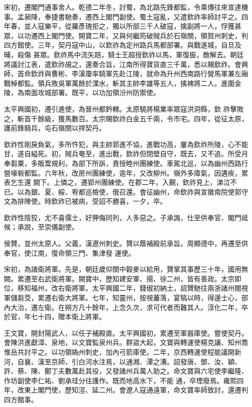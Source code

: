 \begin{pinyinscope}
 宋初，遷閣門通事舍人。乾德二年冬，討蜀，為北路先鋒都監，令乘傳往來宣達機事。孟昶降，奉捷書馳奏，遷西上閣門副使。蜀土寇亂，又遣欽祚率師討平之。四年春，並人寇樂平，從羅彥瑰拒之，獨以所部三千人破寇，擒副將一人，俘獲甚眾，以功遷西上閣門使。開寶二年，又與何繼筠破賊兵於石嶺關，領賀州刺史，判四方館使。三年，契丹寇中山，以欽祚為定州路兵馬都部署。與戰遂城，自旦及晡，殺傷
 甚眾。欽祚馬中流矢踣，騎士王超授欽祚以馬，軍復振，敵解去。朝廷將議討江表，遣欽祚覘之，還奏合旨，江南所得寶貨直三千萬，悉以賜欽祚。會興師，首命欽祚與曹彬、李漢瓊率騎軍先赴江陵，就命為升州西南路行營馬軍兼左廂戰棹都監。領兵敗吳軍萬餘於溧水，斬其主帥李雄等五人，擒裨將二人。進圍金陵，為南面攻城部署。既平，以功加領汾州防禦使。



 太平興國初，遷引進使，為晉州都鈐轄。太原驍將楊業率眾寇洪洞縣，欽
 祚擊敗之，斬首千餘級，獲馬數百。太宗賜欽祚白金五千兩，令市宅。四年，從征太原，護前鋒騎兵，屯石嶺關以捍契丹。



 欽祚性剛戾負氣，多所忤犯，與主帥郭進不協，進戰功高，屢為欽祚所陵，心不能甘，遂自縊死。初，賊兵奄至，進出戰，欽祚但閉壁自守，既去，又不追。所受月奉芻粟，多販鬻規利，為部下所訴，責授睦州團練使。車駕北巡，以為幽州西路行營壕砦都監。六年秋，改房州團練使，逾年，又改柳州。嶺外多瘴氣，因遘疾，累表乞生還
 闕下。上憐之，遷郢州團練使。在郡二年，入覲，欽祚見上，涕泣不已。以為銀、夏、綏、宥都巡檢使，俄召還。會征幽州，命欽祚與宣徽南院使郭守文為排陣使。時欽祚已被病，受詔不勝喜，一夕，卒。



 欽祚性陰狡，尤不喜儒士，好狎侮同列，人多惡之。子承誨，仕至供奉官、閣門祗候；承說，至崇儀副使。



 侯贇，並州太原人。父義，漢遼州刺史。贇以蔭補殿前承旨。周顯德中，再遷至供奉官，使江南，復命領三門、集津發
 運使。



 宋初，為諸衛將軍。先是，朝廷歲仰關中穀麥以給用，贇掌其事歷三十年，國用無闕。累遷至右武衛將軍。開寶中，歷知建安軍、揚、徐二州，皆有善政。太宗即位，移知福州，改右衛將軍。太平興國二年，錢俶初納土，詔贇馳往兩浙諸州閱視軍儲芻茭，累遷右衛大將軍。七年，知靈州，按視蕃落，宴犒以時，得邊士心，部內大治，遷左衛。在朔方凡十餘年，上念久次，求可代者而難其人。淳化二年，卒於官，年七十四，贈本衛上將軍。



 王文寶，開封陽武人，以任子補殿直。太平興國初，累遷至軍器庫使。嘗使契丹。會陳洪進獻漳、泉地，以文寶監泉州兵。群盜大起，文寶與轉運使楊克讓、知州喬惟岳共討平之。以功領媯州刺史，加內弓箭庫使。二年，京西轉運使程能議開新河，自襄、漢至京師，引白河水注焉，以通湘、潭之漕。詔發唐、鄧、汝、穎、許、蔡、陳、鄭丁夫數萬赴其役，又發諸州兵萬人助之。命文寶與六宅使李繼隆、作坊副使李仁祐、劉承珪分往護作。既而地高水下，不能
 通，卒堙廢焉。雍熙四年，改東上閣門使，歷知涇、延二州。會遼人寇通遠軍，命文寶率師致討，還遷判四方館事。




\end{pinyinscope}
